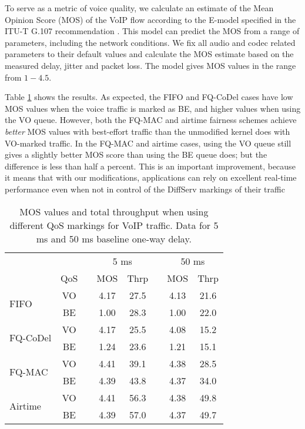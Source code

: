 \documentclass[english]{scrartcl}
\begin{document}
To serve as a metric of voice quality, we calculate an estimate of the Mean
Opinion Score (MOS) of the VoIP flow according to the E-model specified in the
ITU-T G.107 recommendation \cite{_e-model:_2015}. This model can predict the MOS
from a range of parameters, including the network conditions. We fix all audio
and codec related parameters to their default values and calculate the MOS
estimate based on the measured delay, jitter and packet loss. The model gives
MOS values in the range from \(1-4.5\).

Table \ref{tbl:voip-mos} shows the results. As expected, the FIFO and FQ-CoDel
cases have low MOS values when the voice traffic is marked as BE, and higher
values when using the VO queue. However, both the FQ-MAC and airtime fairness
schemes achieve \emph{better} MOS values with best-effort traffic than the unmodified
kernel does with VO-marked traffic. In the FQ-MAC and airtime cases, using the
VO queue still gives a slightly better MOS score than using the BE queue does;
but the difference is less than half a percent. This is an important
improvement, because it means that with our modifications, applications can rely
on excellent real-time performance even when not in control of the DiffServ
markings of their traffic

\begin{table}[htb]
\centering
\small
\begin{tabular}{lcp{1pt}ccp{1pt}cc}
\toprule
& && \multicolumn{2}{c}{5 ms} && \multicolumn{2}{c}{50 ms} \\
 \cmidrule{4-5}  \cmidrule{7-8}
 & QoS && MOS & Thrp &&  MOS & Thrp\\
\midrule
\multirow{2}{*}{FIFO} & VO && 4.17 & 27.5 && 4.13 & 21.6\\
 & BE && 1.00 & 28.3 && 1.00 & 22.0\\
\midrule
\multirow{2}{*}{FQ-CoDel} & VO && 4.17 & 25.5 && 4.08 & 15.2\\
 & BE && 1.24 & 23.6 && 1.21 & 15.1\\
\midrule
\multirow{2}{*}{FQ-MAC} & VO && 4.41 & 39.1 && 4.38 & 28.5\\
 & BE && 4.39 & 43.8 && 4.37 & 34.0\\
\midrule
\multirow{2}{*}{Airtime} & VO && 4.41 & 56.3 && 4.38 & 49.8\\
 & BE && 4.39 & 57.0 && 4.37 & 49.7\\
\bottomrule
\end{tabular}
\caption{\label{tbl:voip-mos}
MOS values and total throughput when using different QoS markings for VoIP traffic.
Data for 5 ms and 50 ms baseline one-way delay.}
\end{table}
\end{document}
